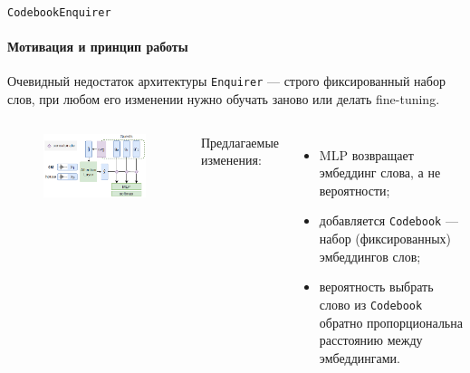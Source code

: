 \documentclass[aspectratio=169]{beamer}
\newcommand{\enquirer}{\texttt{Enquirer}}
\begin{document}
\begin{frame}{\texttt{CodebookEnquirer}}
    \framesubtitle{Мотивация и принцип работы}
    Очевидный недостаток архитектуры \enquirer{} --- строго фиксированный набор
    слов, при любом его изменении нужно обучать заново или делать fine-tuning.
    \vspace{1em}

    \begin{columns}

    \begin{figure}[bht]
    \includegraphics[width=.8\textwidth]{guesser.png}
    \end{figure}

    Предлагаемые изменения:
    \begin{itemize}
        \item MLP возвращает эмбеддинг слова, а не вероятности;
        \item добавляется \texttt{Codebook} --- набор (фиксированных)
            эмбеддингов слов;
        \item вероятность выбрать слово из \texttt{Codebook} обратно
            пропорциональна расстоянию между эмбеддингами.
    \end{itemize}

    \end{columns}
\end{frame}
\end{document}
